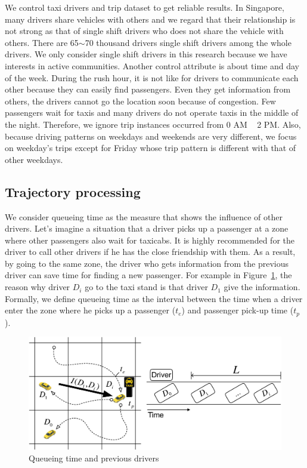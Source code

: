 \documentclass{article}
\begin{document}
We control taxi drivers and trip dataset to get reliable results. In Singapore, many drivers share vehicles with others and we regard that their relationship is not strong as that of single shift drivers who does not share the vehicle with others. There are 65$\sim$70 thousand drivers single shift drivers among the whole drivers. We only consider single shift drivers in this research because we have interests in active communities.  Another control attribute is about time and day of the week. During the rush hour, it is not like for drivers to communicate each other because they can easily find passengers. Even they get information from others, the drivers cannot go the location soon because of congestion. Few passengers wait for taxis and many drivers do not operate taxis in the middle of the night. Therefore, we ignore trip instances occurred from 0 AM ~ 2 PM. Also, because driving patterns on weekdays and weekends are very different, we focus on weekday's trips except for Friday whose trip pattern is different with that of other weekdays.


\subsection{Trajectory processing} \label{sec:traProcessing}

We consider queueing time as the measure that shows the influence of other drivers. Let's imagine a situation that a driver picks up a passenger at a zone where other passengers also wait for taxicabs. It is highly recommended for the driver to call other drivers if he has the close friendship with them. As a result, by going to the same zone, the driver who gets information from the previous driver can save time for finding a new passenger. For example in Figure~\ref{fig:QtimePrevDrivers}, the reason why driver $D_i$ go to the taxi stand is that driver $D_1$ give the information. Formally, we define queueing time as the interval between the time when a driver enter the zone where he picks up a passenger ($t_e$) and passenger pick-up time ($t_p$).

\begin{figure} [h]
  \centering
  \includegraphics[width=1.0\linewidth]{figs/QtimePrevDrivers}
  \caption{Queueing time and previous drivers}
  \label{fig:QtimePrevDrivers}
\end{figure}
\end{document}
